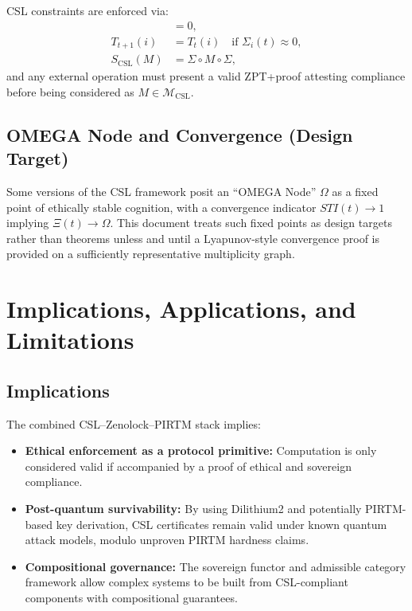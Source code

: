\documentclass[11pt]{article}
\begin{document}
CSL constraints are enforced via:
\begin{align}
  [M, E_\alpha(t_0)] &= 0, \\
  T_{t+1}(i) &= T_t(i) \quad\text{if }\Sigma_i(t) \approx 0, \\
  S_{\mathrm{CSL}}(M) &= \Sigma \circ M \circ \Sigma,
\end{align}
and any external operation must present a valid ZPT+proof attesting compliance before being considered as $M \in \mathcal{M}_{\mathrm{CSL}}$.

\subsection{OMEGA Node and Convergence (Design Target)}

Some versions of the CSL framework posit an ``OMEGA Node'' $\Omega$ as a fixed point of ethically stable cognition,
with a convergence indicator $STI(t) \to 1$ implying $\Xi(t) \to \Omega$.
This document treats such fixed points as design targets rather than theorems unless and until a Lyapunov-style convergence proof is provided on a sufficiently representative multiplicity graph.

\section{Implications, Applications, and Limitations}

\subsection{Implications}

The combined CSL--Zenolock--PIRTM stack implies:

\begin{itemize}[leftmargin=*]
  \item \textbf{Ethical enforcement as a protocol primitive:}
        Computation is only considered valid if accompanied by a proof of ethical and sovereign compliance.
  \item \textbf{Post-quantum survivability:}
        By using Dilithium2 and potentially PIRTM-based key derivation, CSL certificates remain valid under known quantum attack models, modulo unproven PIRTM hardness claims.
  \item \textbf{Compositional governance:}
        The sovereign functor and admissible category framework allow complex systems to be built from CSL-compliant components with compositional guarantees.
\end{itemize}
\end{document}
